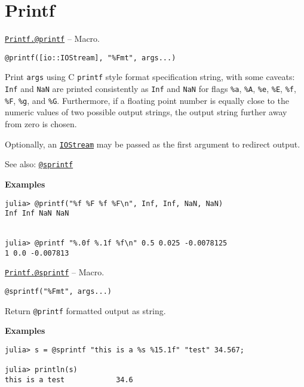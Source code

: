 \hypertarget{5039001780758746770}{}


\chapter{Printf}


\hypertarget{13954719910189591998}{} 
\hyperlink{13954719910189591998}{\texttt{Printf.@printf}}  -- {Macro.}

\begin{adjustwidth}{2em}{0pt}


\begin{verbatim}
@printf([io::IOStream], "%Fmt", args...)
\end{verbatim}

Print \texttt{args} using C \texttt{printf} style format specification string, with some caveats: \texttt{Inf} and \texttt{NaN} are printed consistently as \texttt{Inf} and \texttt{NaN} for flags \texttt{\%a}, \texttt{\%A}, \texttt{\%e}, \texttt{\%E}, \texttt{\%f}, \texttt{\%F}, \texttt{\%g}, and \texttt{\%G}. Furthermore, if a floating point number is equally close to the numeric values of two possible output strings, the output string further away from zero is chosen.

Optionally, an \hyperlink{12496894737220238417}{\texttt{IOStream}} may be passed as the first argument to redirect output.

See also: \hyperlink{13977800180580695709}{\texttt{@sprintf}}

\textbf{Examples}


\begin{verbatim}
julia> @printf("%f %F %f %F\n", Inf, Inf, NaN, NaN)
Inf Inf NaN NaN


julia> @printf "%.0f %.1f %f\n" 0.5 0.025 -0.0078125
1 0.0 -0.007813
\end{verbatim}



\end{adjustwidth}
\hypertarget{13977800180580695709}{} 
\hyperlink{13977800180580695709}{\texttt{Printf.@sprintf}}  -- {Macro.}

\begin{adjustwidth}{2em}{0pt}


\begin{verbatim}
@sprintf("%Fmt", args...)
\end{verbatim}

Return \texttt{@printf} formatted output as string.

\textbf{Examples}


\begin{verbatim}
julia> s = @sprintf "this is a %s %15.1f" "test" 34.567;

julia> println(s)
this is a test            34.6
\end{verbatim}



\end{adjustwidth}

